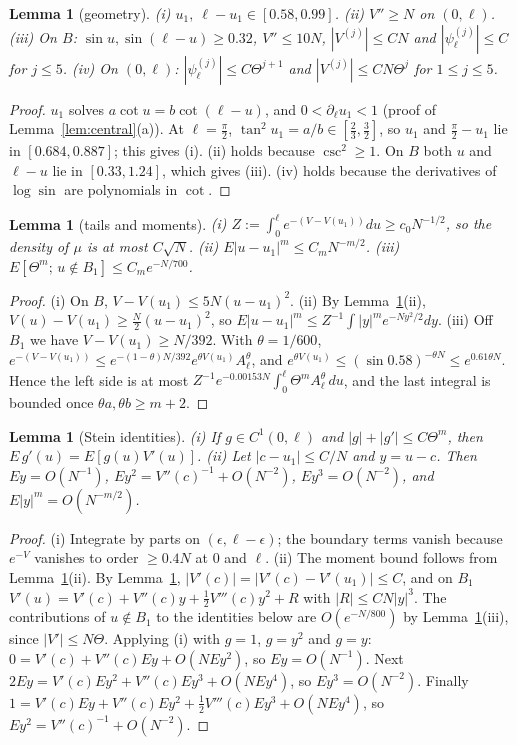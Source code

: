 \documentclass[11pt]{amsart}
\newtheorem{lemma}[theorem]{Lemma}
\theoremstyle{definition}
\begin{document}
\begin{lemma}[geometry]\label{lem:geo}
(i) $u_1,\ \ell-u_1\in[0.58,0.99]$. (ii) $V''\ge N$ on $(0,\ell)$. (iii) On $B$: $\sin u,\sin(\ell-u)\ge0.32$, $V''\le10N$, $|V^{(j)}|\le CN$ and
$|\psi_\ell^{(j)}|\le C$ for $j\le5$. (iv) On $(0,\ell)$: $|\psi_\ell^{(j)}|\le C\Theta^{j+1}$ and $|V^{(j)}|\le CN\Theta^{j}$ for $1\le j\le5$.
\end{lemma}
\begin{proof}
$u_1$ solves $a\cot u=b\cot(\ell-u)$, and $0<\partial_\ell u_1<1$ (proof of Lemma~\ref{lem:central}(a)). At $\ell=\frac\pi2$, $\tan^2u_1=a/b\in[\frac23,\frac32]$,
so $u_1$ and $\frac\pi2-u_1$ lie in $[0.684,0.887]$; this gives (i). (ii) holds because $\csc^2\ge1$. On $B$ both $u$ and $\ell-u$ lie in $[0.33,1.24]$, which gives (iii). (iv) holds
because the derivatives of $\log\sin$ are polynomials in $\cot$.
\end{proof}

\begin{lemma}[tails and moments]\label{lem:mom}
(i) $Z:=\int_0^\ell e^{-(V-V(u_1))}du\ge c_0N^{-1/2}$, so the density of $\mu$ is at most $C\sqrt N$. (ii) $E|u-u_1|^m\le C_mN^{-m/2}$.
(iii) $E[\Theta^m;\,u\notin B_1]\le C_me^{-N/700}$.
\end{lemma}
\begin{proof}
(i) On $B$, $V-V(u_1)\le5N(u-u_1)^2$. (ii) By Lemma~\ref{lem:geo}(ii), $V(u)-V(u_1)\ge\frac N2(u-u_1)^2$, so
$E|u-u_1|^m\le Z^{-1}\int|y|^me^{-Ny^2/2}dy$. (iii) Off $B_1$ we have $V-V(u_1)\ge N/392$. With $\theta=1/600$,
$e^{-(V-V(u_1))}\le e^{-(1-\theta)N/392}e^{\theta V(u_1)}A_\ell^{\theta}$, and $e^{\theta V(u_1)}\le(\sin0.58)^{-\theta N}\le e^{0.61\theta N}$. Hence the left side is at
most $Z^{-1}e^{-0.00153N}\int_0^\ell\Theta^mA_\ell^\theta\,du$, and the last integral is bounded once $\theta a,\theta b\ge m+2$.
\end{proof}

\begin{lemma}[Stein identities]\label{lem:stein}
(i) If $g\in C^1(0,\ell)$ and $|g|+|g'|\le C\Theta^m$, then $E\,g'(u)=E[g(u)V'(u)]$.
(ii) Let $|c-u_1|\le C/N$ and $y=u-c$. Then $Ey=O(N^{-1})$, $Ey^2=V''(c)^{-1}+O(N^{-2})$, $Ey^3=O(N^{-2})$, and $E|y|^m=O(N^{-m/2})$.
\end{lemma}
\begin{proof}
(i) Integrate by parts on $(\epsilon,\ell-\epsilon)$; the boundary terms vanish because $e^{-V}$ vanishes to order $\ge0.4N$ at $0$ and $\ell$.
(ii) The moment bound follows from Lemma~\ref{lem:mom}(ii). By Lemma~\ref{lem:geo}, $|V'(c)|=|V'(c)-V'(u_1)|\le C$, and on $B_1$
$V'(u)=V'(c)+V''(c)y+\frac12V'''(c)y^2+R$ with $|R|\le CN|y|^3$. The contributions of $u\notin B_1$ to the identities below are
$O(e^{-N/800})$ by Lemma~\ref{lem:mom}(iii), since $|V'|\le N\Theta$. Applying (i) with $g=1$, $g=y^2$ and $g=y$:
$0=V'(c)+V''(c)Ey+O(NEy^2)$, so $Ey=O(N^{-1})$. Next $2Ey=V'(c)Ey^2+V''(c)Ey^3+O(NEy^4)$, so $Ey^3=O(N^{-2})$. Finally
$1=V'(c)Ey+V''(c)Ey^2+\frac12V'''(c)Ey^3+O(NEy^4)$, so $Ey^2=V''(c)^{-1}+O(N^{-2})$.
\end{proof}
\end{document}
